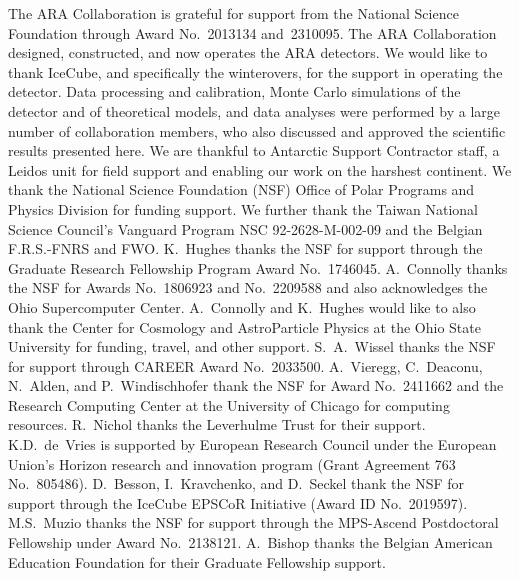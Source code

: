 \noindent
The ARA Collaboration is grateful for support from the National Science Foundation through Award No.~2013134 and~2310095.
The ARA Collaboration designed, constructed, and now operates the ARA detectors. 
We would like to thank IceCube, and specifically the winterovers, for the support in operating the detector. 
Data processing and calibration, Monte Carlo simulations of the detector and of theoretical models, and data analyses were performed by a large number
of collaboration members, who also discussed and approved the scientific results presented here. 
We are thankful to Antarctic Support Contractor staff, a Leidos unit for field support and enabling our work on the harshest continent. 
We thank the National Science Foundation (NSF) Office of Polar Programs and Physics Division for funding support.
We further thank the Taiwan National Science Council's Vanguard Program NSC 92-2628-M-002-09 and the Belgian F.R.S.-FNRS and FWO.
K.~Hughes thanks the NSF for support through the Graduate Research Fellowship Program Award No.~1746045. 
A.~Connolly thanks the NSF for Awards No.~1806923 and No.~2209588 and also acknowledges the Ohio Supercomputer Center. 
A.~Connolly and K.~Hughes would like to also thank the Center for Cosmology and AstroParticle Physics at the Ohio State University for funding, travel, and other support.
S.~A.~Wissel thanks the NSF for support through CAREER Award No.~2033500.
A.~Vieregg, C.~Deaconu, N.~Alden, and P.~Windischhofer thank the NSF for Award No.~2411662 and the Research Computing Center at the University of Chicago
for computing resources.
R.~Nichol thanks the Leverhulme Trust for their support. 
K.D.~de~Vries is supported by European Research Council under the European Union's Horizon research and innovation program (Grant Agreement 763 No.~805486). 
D.~Besson, I.~Kravchenko, and D.~Seckel thank the NSF for support through the IceCube EPSCoR Initiative (Award ID No.~2019597). 
M.S.~Muzio thanks the NSF for support through the MPS-Ascend Postdoctoral Fellowship under Award No.~2138121. 
A.~Bishop thanks the Belgian American Education Foundation for their Graduate Fellowship support.

